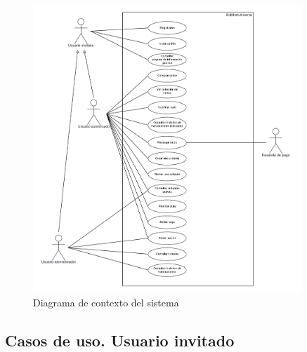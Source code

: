 \begin{figure}[H]
    \centering
    \includegraphics[width=0.9\textwidth]{figures/6-Analisis/6-Casos-uso/6_Diagrama-contexto.png}
    \caption{Diagrama de contexto del sistema}
    \label{fig:diagrama_contexto}
\end{figure}


\subsection{Casos de uso. Usuario invitado}
